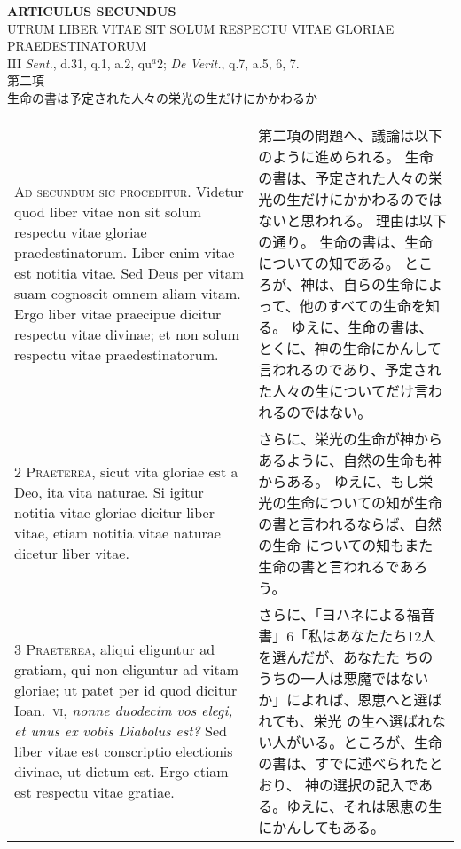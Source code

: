\documentclass[10pt]{jsarticle} %
\begin{document}
\begin{center}
 {\Large {\bf ARTICULUS SECUNDUS}}\\
 {\large UTRUM LIBER VITAE SIT SOLUM RESPECTU VITAE GLORIAE PRAEDESTINATORUM}\\
 {\footnotesize III {\itshape Sent.}, d.31, q.1, a.2, qu$^a$2; {\itshape
 De Verit.}, q.7, a.5, 6, 7.}\\
 {\Large 第二項\\生命の書は予定された人々の栄光の生だけにかかわるか}
\end{center}

\begin{longtable}{p{21em}p{21em}}


{\Huge A}{\scshape d secundum sic proceditur}. Videtur quod
 liber vitae non sit solum respectu vitae gloriae
 praedestinatorum. Liber enim vitae est notitia vitae. Sed Deus per
 vitam suam cognoscit omnem aliam vitam. Ergo liber vitae praecipue
 dicitur respectu vitae divinae; et non solum respectu vitae
 praedestinatorum.


&

第二項の問題へ、議論は以下のように進められる。
生命の書は、予定された人々の栄光の生だけにかかわるのではないと思われる。
 理由は以下の通り。
生命の書は、生命についての知である。
ところが、神は、自らの生命によって、他のすべての生命を知る。
ゆえに、生命の書は、とくに、神の生命にかんして言われるのであり、予定され
 た人々の生についてだけ言われるのではない。


\\


{\scshape 2 Praeterea}, sicut vita gloriae est a Deo,
 ita vita naturae. Si igitur notitia vitae gloriae dicitur liber vitae,
 etiam notitia vitae naturae dicetur liber vitae.


&

さらに、栄光の生命が神からあるように、自然の生命も神からある。
ゆえに、もし栄光の生命についての知が生命の書と言われるならば、自然の生命
 についての知もまた生命の書と言われるであろう。


\\


{\scshape 3 Praeterea}, aliqui eliguntur ad gratiam, qui
 non eliguntur ad vitam gloriae; ut patet per id quod dicitur Ioan.~{\scshape vi},
 {\itshape nonne duodecim vos elegi, et unus ex vobis Diabolus est?} Sed liber
 vitae est conscriptio electionis divinae, ut dictum est. Ergo etiam est
 respectu vitae gratiae.


&

さらに、「ヨハネによる福音書」6「私はあなたたち12人を選んだが、あなたた
 ちのうちの一人は悪魔ではないか」によれば、恩恵へと選ばれても、栄光
 の生へ選ばれない人がいる。ところが、生命の書は、すでに述べられたとおり、
 神の選択の記入である。ゆえに、それは恩恵の生にかんしてもある。



\end{longtable}
\end{document}

